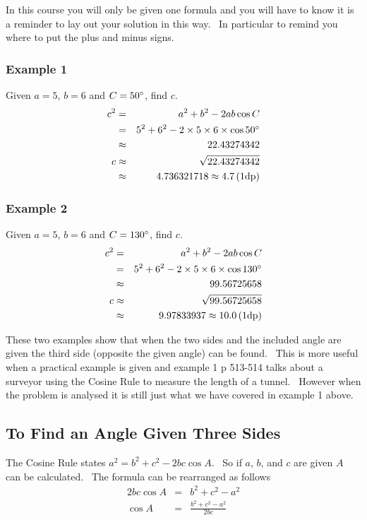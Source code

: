 In this course you will only be given one formula and you will have to know it is a reminder to
lay out your solution in this way. \ In particular to remind you where to put the plus and minus signs. 

\subsubsection{Example 1}
Given $a =5$, $b =6$ and $C =50 \mbox{{\ensuremath{{}^\circ}}}$, find $c$.
\begin{align*}c^{2} &  = & a^{2} +b^{2} -2 a b \cos  C \\
 &  = & 5^{2} +6^{2} -2 \times 5 \times 6 \times \cos  50 \mbox{{\ensuremath{{}^\circ}}} \\
 &  \approx  & 22.43274342 \\
c &  \approx  & \sqrt{22.43274342} \\
 &  \approx  & 4.736321718 \approx 4.7 \left (1\text{dp}\right )\end{align*}

\subsubsection{Example 2}
Given $a =5$, $b =6$ and $C =130 \mbox{{\ensuremath{{}^\circ}}}$, find $c$.
\begin{align*}c^{2} &  = & a^{2} +b^{2} -2 a b \cos  C \\
 &  = & 5^{2} +6^{2} -2 \times 5 \times 6 \times \cos  130 \mbox{{\ensuremath{{}^\circ}}} \\
 &  \approx  & 99.56725658 \\
c &  \approx  & \sqrt{99.56725658} \\
 &  \approx  & 9.97833937 \approx 10.0 \left (1\text{dp}\right )\end{align*}

These two examples show that when the two sides and the included angle are given the third side
(opposite the given angle) can be found. \ This is more useful when a practical example is given and example 1
p 513-514 talks about a surveyor using the Cosine Rule to measure the length of a tunnel. \ However when the problem
is analysed it is still just what we have covered in example 1 above. 

\subsection{To Find an Angle Given Three Sides}
The Cosine Rule states $a^{2} =b^{2} +c^{2} -2 b c \cos  A\text{.}$ \ So if $a$, $b$, and $c$ are given $A$ can be calculated. \ The formula can be rearranged as follows
\begin{align*}2 b c \cos  A &  = & b^{2} +c^{2} -a^{2} \\
\cos  A &  = & \frac{b^{2} +c^{2} -a^{2}}{2 b c}\end{align*}


